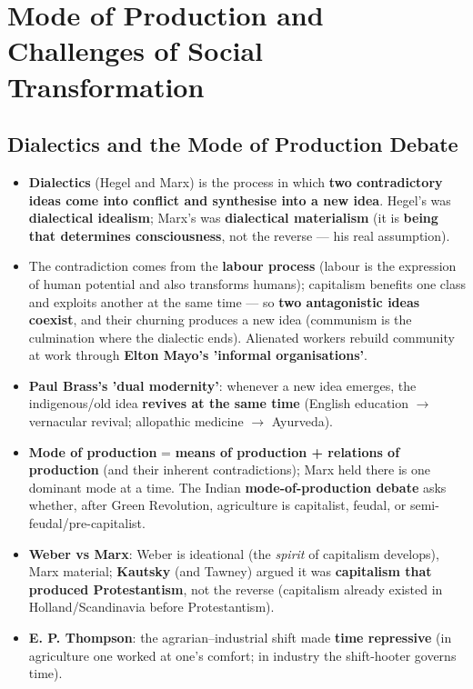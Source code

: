 \chapter{Mode of Production and Challenges of Social Transformation}

\section{Dialectics and the Mode of Production Debate}

\begin{KeyConcept}
\begin{itemize}
\item \textbf{Dialectics} (Hegel and Marx) is the process in which \textbf{two contradictory ideas come into conflict and synthesise into a new idea}. Hegel's was \textbf{dialectical idealism}; Marx's was \textbf{dialectical materialism} (it is \textbf{being that determines consciousness}, not the reverse --- his real assumption).
\item The contradiction comes from the \textbf{labour process} (labour is the expression of human potential and also transforms humans); capitalism benefits one class and exploits another at the same time --- so \textbf{two antagonistic ideas coexist}, and their churning produces a new idea (communism is the culmination where the dialectic ends). Alienated workers rebuild community at work through \textbf{Elton Mayo's 'informal organisations'}.
\item \textbf{Paul Brass's 'dual modernity'}: whenever a new idea emerges, the indigenous/old idea \textbf{revives at the same time} (English education $\rightarrow$ vernacular revival; allopathic medicine $\rightarrow$ Ayurveda).
\item \textbf{Mode of production} = \textbf{means of production + relations of production} (and their inherent contradictions); Marx held there is one dominant mode at a time. The Indian \textbf{mode-of-production debate} asks whether, after Green Revolution, agriculture is capitalist, feudal, or semi-feudal/pre-capitalist.
\item \textbf{Weber vs Marx}: Weber is ideational (the \emph{spirit} of capitalism develops), Marx material; \textbf{Kautsky} (and Tawney) argued it was \textbf{capitalism that produced Protestantism}, not the reverse (capitalism already existed in Holland/Scandinavia before Protestantism).
\item \textbf{E. P. Thompson}: the agrarian--industrial shift made \textbf{time repressive} (in agriculture one worked at one's comfort; in industry the shift-hooter governs time).
\end{itemize}
\end{KeyConcept}

